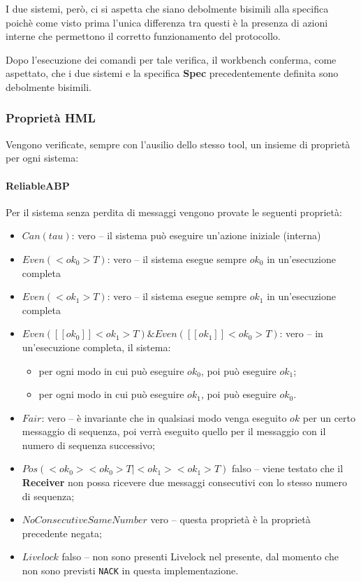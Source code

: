I due sistemi, però, ci si aspetta che siano debolmente bisimili alla
specifica poichè come visto prima l'unica differenza tra questi è la presenza
di azioni interne che permettono il corretto funzionamento del protocollo.

Dopo l'esecuzione dei comandi per tale verifica, il workbench conferma, come
aspettato, che i due sistemi e la specifica \textbf{Spec} precedentemente
definita sono debolmente bisimili.

\subsubsection{Proprietà HML}

Vengono verificate, sempre con l'ausilio dello stesso tool, un insieme di
proprietà per ogni sistema:

\paragraph{ReliableABP} \mbox{}

Per il sistema senza perdita di messaggi vengono provate le seguenti proprietà:

\begin{itemize}
  \item $Can(tau)$: vero -- il sistema può eseguire un'azione iniziale
    (interna)
  \item $Even(<ok_0>T)$: vero -- il sistema esegue sempre $ok_0$ in
    un'esecuzione completa
  \item $Even(<ok_1>T)$: vero -- il sistema esegue sempre $ok_1$ in
    un'esecuzione completa
  \item $Even([[ok_0]]<ok_1>T) \&{} Even([[ok_1]]<ok_0>T)$: vero -- in
    un'esecuzione completa, il sistema:
    \begin{itemize}
      \item per ogni modo in cui può eseguire $ok_0$, poi può eseguire $ok_1$;
      \item per ogni modo in cui può eseguire $ok_1$, poi può eseguire $ok_0$.
    \end{itemize}
  \item $Fair$: vero -- è invariante che in qualsiasi modo venga eseguito $ok$
    per un certo messaggio di sequenza, poi verrà eseguito quello per il
    messaggio con il numero di sequenza successivo;
  \item $Pos(<ok_0><ok_0>T | <ok_1><ok_1>T)$ falso -- viene testato che il
    \textbf{Receiver} non possa ricevere due messaggi consecutivi con lo stesso
    numero di sequenza;
  \item $NoConsecutiveSameNumber$ vero -- questa proprietà è la proprietà
    precedente negata;
  \item $Livelock$ falso -- non sono presenti Livelock nel presente, dal
    momento che non sono previsti \texttt{NACK} in questa implementazione.
\end{itemize}

